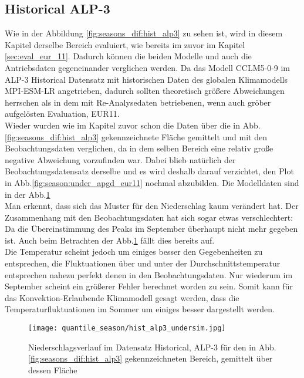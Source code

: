 \subsection{Historical ALP-3}
Wie in der Abbildung \ref{fig:seasons_dif:hist_alp3} zu sehen ist, wird in diesem Kapitel derselbe Bereich evaluiert, wie bereits im zuvor im Kapitel \ref{sec:eval_eur_11}. Dadurch können die beiden Modelle und auch die Antriebsdaten gegeneinander verglichen werden. Da das Modell CCLM5-0-9 im ALP-3 Historical Datensatz mit historischen Daten des globalen Klimamodells MPI-ESM-LR angetrieben, dadurch sollten theoretisch größere Abweichungen herrschen als in dem mit Re-Analysedaten betriebenen, wenn auch gröber aufgelösten Evaluation, EUR11.\\
Wieder wurden wie im Kapitel zuvor schon die Daten über die in Abb.\ref{fig:seasons_dif:hist_alp3} gekennzeichnete Fläche gemittelt und mit den Beobachtungsdaten verglichen, da in dem selben Bereich eine relativ große negative Abweichung vorzufinden war. Dabei blieb natürlich der Beobachtungsdatensatz derselbe und es wird deshalb darauf verzichtet, den Plot in Abb.\ref{fig:season:under_apgd_eur11} nochmal abzubilden. Die Modelldaten sind in der Abb.\ref{fig:season:under_hist_alp3}\\
Man erkennt, dass sich das Muster für den Niederschlag kaum verändert hat. Der Zusammenhang mit den Beobachtungsdaten hat sich sogar etwas verschlechtert: Da die Übereinstimmung des Peaks im September überhaupt nicht mehr gegeben ist. Auch beim Betrachten der Abb.\ref{fig:season:under_hist_alp3} fällt dies bereits auf.\\
Die Temperatur scheint jedoch um einiges besser den Gegebenheiten zu entsprechen, die Fluktuationen über und unter der Durchschnittstemperatur entsprechen nahezu perfekt denen in den Beobachtungsdaten. Nur wiederum im September scheint ein größerer Fehler berechnet worden zu sein. Somit kann für das Konvektion-Erlaubende Klimamodell gesagt werden, dass die Temperaturfluktuationen im Sommer um einiges besser dargestellt werden.
\begin{figure}[h]
	\texttt{[image: quantile\_season/hist\_alp3\_undersim.jpg]}
	\caption{Niederschlagsverlauf im Datensatz Historical, ALP-3 für den in Abb.\ref{fig:seasons_dif:hist_alp3} gekennzeichneten Bereich, gemittelt über dessen Fläche}
	\label{fig:season:under_hist_alp3}
\end{figure}
